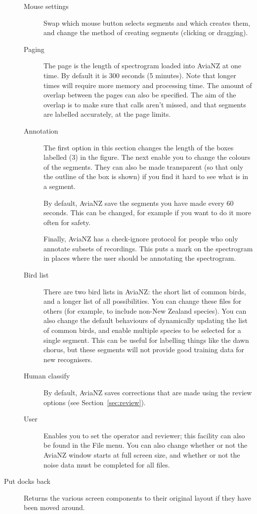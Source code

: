 \documentclass{article}
\begin{document}
\begin{description}
\begin{description}
\item[Mouse settings] Swap which mouse button selects segments and which creates them, and change the method of creating segments (clicking or dragging).
\item[Paging] The page is the length of spectrogram loaded into AviaNZ at one time. By default it is 300 seconds (5 minutes). Note that longer times will require more memory and processing time. The amount of overlap between the pages can also be specified. The aim of the overlap is to make sure that calls aren't missed, and that segments are labelled accurately, at the page limits. 
\item[Annotation] The first option in this section changes the length of the boxes labelled (3) in the figure. The next enable you to change the colours of the segments. They can also be made transparent (so that only the outline of the box is shown) if you find it hard to see what is in a segment. 

By default, AviaNZ save the segments you have made every 60 seconds. This can be changed, for example if you want to do it more often for safety. 

Finally, AviaNZ has a check-ignore protocol for people who only annotate subsets of recordings. This puts a mark on the spectrogram in places where the user should be annotating the spectrogram. 
\item[Bird list] There are two bird lists in AviaNZ: the short list of common birds, and a longer list of all possibilities. You can change these files for others (for example, to include non-New Zealand species). %
You can also change the default behaviours of dynamically updating the list of common birds, and enable multiple species to be selected for a single segment. This can be useful for labelling things like the dawn chorus, but these segments will not provide good training data for new recognisers. 
\item[Human classify] By default, AviaNZ saves corrections that are made using the review options (see Section~\ref{sec:review}). 
\item[User] Enables you to set the operator and reviewer; this facility can also be found in the File menu. You can also change whether or not the AviaNZ window starts at full screen size, and whether or not the noise data must be completed for all files. 
\end{description}
\item [Put docks back] Returns the various screen components to their original layout if they have been moved around. 
\end{description}
\end{document}
